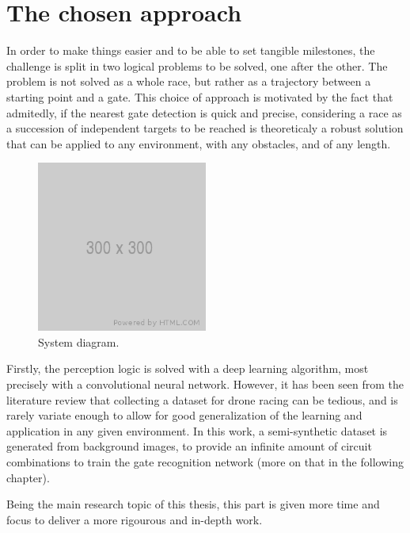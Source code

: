 \section{The chosen approach}

In order to make things easier and to be able to set tangible milestones, the
challenge is split in two logical problems to be solved, one after the
other. The problem is not solved as a whole race, but rather as a trajectory
between a starting point and a gate. This choice of approach is motivated by
the fact that admitedly, if the nearest gate detection is quick and precise,
considering a race as a succession of independent targets to be reached is
theoreticaly a robust solution that can be applied to any environment, with any
obstacles, and of any length.\\

\begin{figure}[h]
	\centering
	\includegraphics[width=0.5\textwidth]{figure/300x300.png}
	\caption{System diagram.}
	\label{fig:iros}
\end{figure}

Firstly, the perception logic is solved with a deep learning algorithm, most
precisely with a convolutional neural network. However, it has been seen from
the literature review that collecting a dataset for drone racing can be
tedious, and is rarely variate enough to allow for good generalization of the
learning and application in any given environment. In this work, a
semi-synthetic dataset is generated from background images, to provide an
infinite amount of circuit combinations to train the gate recognition network
(more on that in the following chapter).

Being the main research topic of this thesis, this part is given more time and
focus to deliver a more rigourous and in-depth work.\\

